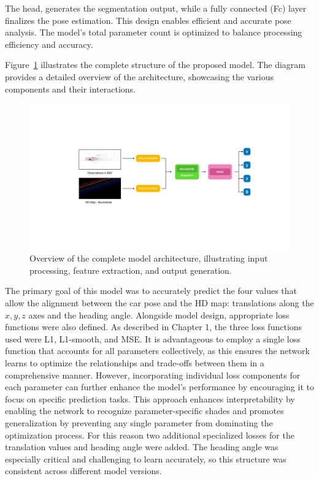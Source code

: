 The head, generates the segmentation output, while a fully connected (Fc) layer finalizes the pose estimation. This design enables efficient and accurate pose analysis. The model’s total parameter count is optimized to balance processing efficiency and accuracy.

Figure~\ref{fig:model1} illustrates the complete structure of the proposed model. The diagram provides a detailed overview of the architecture, showcasing the various components and their interactions. 
\begin{figure}[H]
    \centering
    \includegraphics[width=1\linewidth]{LateX//figs/architecture1.pdf}
    \caption{Overview of the complete model architecture, illustrating input processing, feature extraction, and output generation.}
    \label{fig:model1}
\end{figure}

The primary goal of this model was to accurately predict the four values that allow the alignment between the car pose and the HD map: translations along the \( x, y, z \) axes and the heading angle. Alongside model design, appropriate loss functions were also defined. As described in Chapter 1, the three loss functions used were L1, L1-smooth, and MSE.
It is advantageous to employ a single loss function that accounts for all parameters collectively, as this ensures the network learns to optimize the relationships and trade-offs between them in a comprehensive manner. However, incorporating individual loss components for each parameter can further enhance the model's performance by encouraging it to focus on specific prediction tasks. This approach enhances interpretability by enabling the network to recognize parameter-specific shades and promotes generalization by preventing any single parameter from dominating the optimization process. For this reason two additional specialized losses for the translation values and heading angle were added. 
The heading angle was especially critical and challenging to learn accurately, so this structure was consistent across different model versions.

